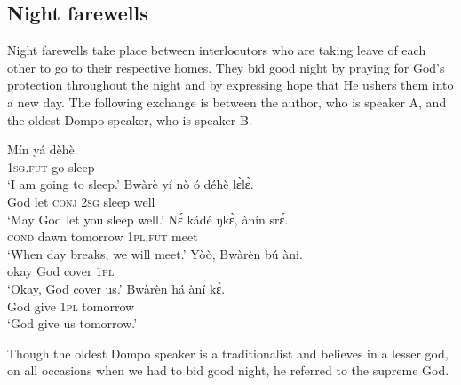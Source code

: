 \documentclass[output=paper,colorlinks,citecolor=brown]{langscibook}
\begin{document}
\subsection{Night farewells}

Night farewells take place between interlocutors who are taking leave of each other to go to their respective homes. They bid good night by praying for God’s protection throughout the night and by expressing hope that He ushers them into a new day. The following exchange is between the author, who is speaker A, and the oldest Dompo speaker, who is speaker B.

\ea \label{ex:nightgreet}
\begin{xlist}
\ex 
    \gll Mín		yá	dèhè.\\
		\textsc{1sg.fut}	go	sleep\\
	\glt	‘I am going to sleep.’
\ex
    \gll Bwàrè	yí	nò	ó	déhè	lɛ̀lɛ̀.\\
		God	let	\textsc{conj}	\textsc{2sg}	sleep	well\\
	\glt	‘May God let you sleep well.’
\ex
   \gll Nɛ́	kádé	ŋkɛ̀,		ànín		srɛ́.\\
		\textsc{cond}	dawn	tomorrow	\textsc{1pl.fut}	meet\\
	\glt	‘When day breaks, we will meet.’
\ex 
    \gll Yòò,	Bwàrèn	bú	àni.\\
		okay	God		cover	\textsc{1pl}	\\
        \glt ‘Okay, God cover us.’
\ex
   \gll  Bwàrèn	há	àní	kɛ̀.\\
		God		give	\textsc{1pl}	tomorrow\\
	\glt	‘God give us tomorrow.’
\end{xlist}
\z

Though the oldest Dompo speaker is a traditionalist and believes in a lesser god, on all occasions when we had to bid good night, he referred to the supreme God.  
\end{document}

